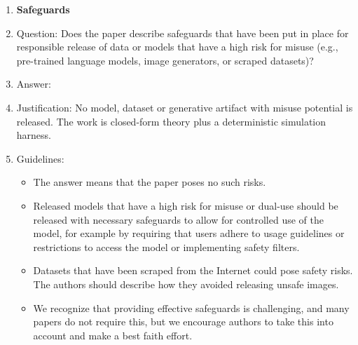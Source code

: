 \begin{enumerate}
\item {\bf Safeguards}
    \item[] Question: Does the paper describe safeguards that have been put in place for responsible release of data or models that have a high risk for misuse (e.g., pre-trained language models, image generators, or scraped datasets)?
    \item[] Answer: \answerNA{}
    \item[] Justification: No model, dataset or generative artifact with misuse potential is released. The work is closed-form theory plus a deterministic simulation harness.
    \item[] Guidelines:
    \begin{itemize}
        \item The answer \answerNA{} means that the paper poses no such risks.
        \item Released models that have a high risk for misuse or dual-use should be released with necessary safeguards to allow for controlled use of the model, for example by requiring that users adhere to usage guidelines or restrictions to access the model or implementing safety filters. 
        \item Datasets that have been scraped from the Internet could pose safety risks. The authors should describe how they avoided releasing unsafe images.
        \item We recognize that providing effective safeguards is challenging, and many papers do not require this, but we encourage authors to take this into account and make a best faith effort.
    \end{itemize}


\end{enumerate}
